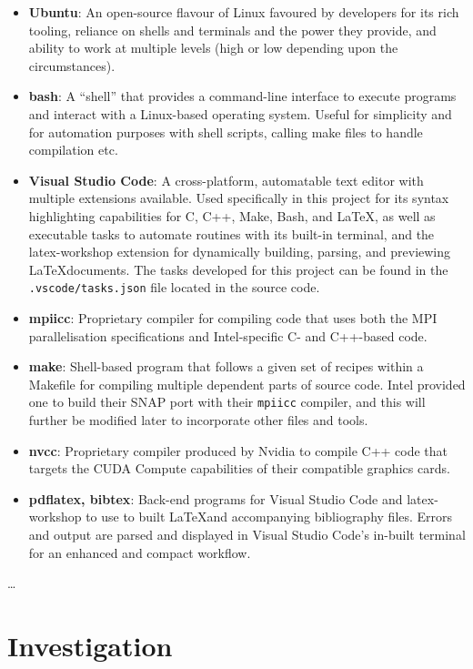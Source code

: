 \documentclass[conference]{IEEEtran}
\begin{document}
\begin{itemize}
    \item \textbf{Ubuntu}: An open-source flavour of Linux favoured by developers for its rich tooling, reliance on shells and terminals and the power they provide, and ability to work at multiple levels (high or low depending upon the circumstances).
    \item \textbf{bash}: A ``shell'' that provides a command-line interface to execute programs and interact with a Linux-based operating system. Useful for simplicity and for automation purposes with shell scripts, calling make files to handle compilation etc.
    \item \textbf{Visual Studio Code}: A cross-platform, automatable text editor with multiple extensions available. Used specifically in this project for its syntax highlighting capabilities for C, C++, Make, Bash, and \LaTeX, as well as executable tasks to automate routines with its built-in terminal, and the latex-workshop extension for dynamically building, parsing, and previewing \LaTeX documents. The tasks developed for this project can be found in the \texttt{.vscode/tasks.json} file located in the source code.
    \item \textbf{mpiicc}: Proprietary compiler for compiling code that uses both the MPI parallelisation specifications and Intel-specific C- and C++-based code.
    \item \textbf{make}: Shell-based program that follows a given set of recipes within a Makefile for compiling multiple dependent parts of source code. Intel provided one to build their SNAP port with their \texttt{mpiicc} compiler, and this will further be modified later to incorporate other files and tools.
    \item \textbf{nvcc}: Proprietary compiler produced by Nvidia to compile C++ code that targets the CUDA Compute capabilities of their compatible graphics cards.
    \item \textbf{pdflatex, bibtex}: Back-end programs for Visual Studio Code and latex-workshop to use to built \LaTeX and accompanying bibliography files. Errors and output are parsed and displayed in Visual Studio Code's in-built terminal for an enhanced and compact workflow.
\end{itemize}

\dots



\section{Investigation}
\label{sec:investigation}
\end{document}
